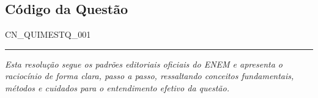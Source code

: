 \documentclass{article}
\begin{document}
\subsection*{Código da Questão}

CN\_QUIMESTQ\_001

\bigskip

\hrule

\bigskip

\textit{Esta resolução segue os padrões editoriais oficiais do ENEM e apresenta o raciocínio de forma clara, passo a passo, ressaltando conceitos fundamentais, métodos e cuidados para o entendimento efetivo da questão.}
\end{document}

